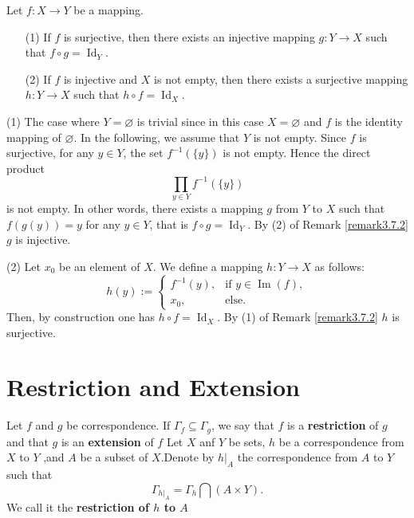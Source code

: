 \documentclass{book}
\numberwithin{equation}{section}
\begin{document}
\begin{propositionenv}
\label{prop:direct-product-factorization}
Let $f : X \to Y$ be a mapping.
\begin{enumerate}
    \item[(1)] If $f$ is surjective, then there exists an injective mapping $g : Y \to X$ such that $f \circ g = \operatorname{Id}_Y$.
    \item[(2)] If $f$ is injective and $X$ is not empty, then there exists a surjective mapping $h : Y \to X$ such that $h \circ f = \operatorname{Id}_X$.
\end{enumerate}
\end{propositionenv}

\begin{proofenv}
(1) The case where $Y = \varnothing$ is trivial since in this case $X = \varnothing$ and $f$ is the identity mapping of $\varnothing$. In the following, we assume that $Y$ is not empty. Since $f$ is surjective, for any $y \in Y$, the set $f^{-1}(\{y\})$ is not empty. Hence the direct product
\[
\prod_{y \in Y} f^{-1}(\{y\})
\]
is not empty. In other words, there exists a mapping $g$ from $Y$ to $X$ such that $f(g(y)) = y$ for any $y \in Y$, that is $f \circ g = \operatorname{Id}_Y$. By (2) of Remark \ref{remark3.7.2} $g$ is injective.

(2) Let $x_0$ be an element of $X$. We define a mapping $h : Y \to X$ as follows:
\[
h(y) := 
\begin{cases}
f^{-1}(y), & \text{if } y \in \operatorname{Im}(f), \\
x_0, & \text{else}.
\end{cases}
\]
Then, by construction one has $h \circ f = \operatorname{Id}_X$. 
\newline
By (1) of Remark \ref{remark3.7.2} $h$ is surjective.
\end{proofenv}
\section{Restriction and Extension}
\begin{definitionenv}
    Let $f$ and $g$ be correspondence. If $\Gamma _f\subseteq \Gamma _g$, we say that $f$ is a \textbf{restriction} of $g$ and that $g$ is an \textbf{extension} of $f$
    \newline
    Let $X$ anf $Y$ be sets, $h$ be a correspondence from $X$ to $Y$ ,and $A$ be a subset of $X$.Denote by $h|_A$ the correspondence from $A$ to $Y$ such that$$\Gamma_{h|_A}=\Gamma_h\bigcap (A\times Y).$$ We call it the \textbf{restriction of $h$ to $A$}
\end{definitionenv}
\end{document}
